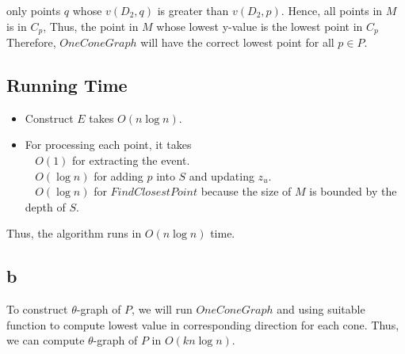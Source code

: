\documentclass[12pt]{article}
\begin{document}
only points $q$ whose $v(D_2,q)$ is greater than $v(D_2,p)$. Hence, all points in $M$ is in $C_p$,
Thus, the point in $M$ whose lowest y-value is the lowest point in $C_p$ \\

\newpage
Therefore, $OneConeGraph$ will have the correct lowest point for all $p \in P$.

\subsection*{Running Time}
\begin{itemize}
    \item Construct $E$ takes $O(n\log{n})$.
    \item For processing each point, it takes \\
    $\;\;$ $O(1)$ for extracting the event.\\
    $\;\;$ $O(\log{n})$ for adding $p$ into $S$ and updating $z_u$.\\
    $\;\;$ $O(\log{n})$ for $FindClosestPoint$ because the size of $M$ is bounded by the depth of $S$.
\end{itemize}

Thus, the algorithm runs in $O(n\log{n})$ time.

\subsection*{b}
To construct $\theta$-graph of $P$, we will run $OneConeGraph$ and using suitable function to compute lowest value in corresponding
direction for each cone. Thus, we can compute $\theta$-graph of $P$ in $O(kn\log{n})$.
\end{document}
